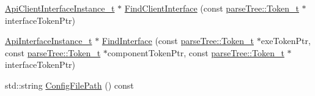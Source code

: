 \begin{DoxyCompactItemize}
\item 
\hyperlink{structmodel_1_1_api_client_interface_instance__t}{Api\+Client\+Interface\+Instance\+\_\+t} $\ast$ \hyperlink{structmodel_1_1_app__t_afb39d866a6a33fdc8a5db5e2392a3003}{Find\+Client\+Interface} (const \hyperlink{structparse_tree_1_1_token__t}{parse\+Tree\+::\+Token\+\_\+t} $\ast$interface\+Token\+Ptr)
\item 
\hyperlink{structmodel_1_1_api_interface_instance__t}{Api\+Interface\+Instance\+\_\+t} $\ast$ \hyperlink{structmodel_1_1_app__t_aaed6089b29e4398c4446edfe7643a214}{Find\+Interface} (const \hyperlink{structparse_tree_1_1_token__t}{parse\+Tree\+::\+Token\+\_\+t} $\ast$exe\+Token\+Ptr, const \hyperlink{structparse_tree_1_1_token__t}{parse\+Tree\+::\+Token\+\_\+t} $\ast$component\+Token\+Ptr, const \hyperlink{structparse_tree_1_1_token__t}{parse\+Tree\+::\+Token\+\_\+t} $\ast$interface\+Token\+Ptr)
\item 
std\+::string \hyperlink{structmodel_1_1_app__t_a90a4116ca5d9e34661444c2e94f9dba6}{Config\+File\+Path} () const 
\end{DoxyCompactItemize}
